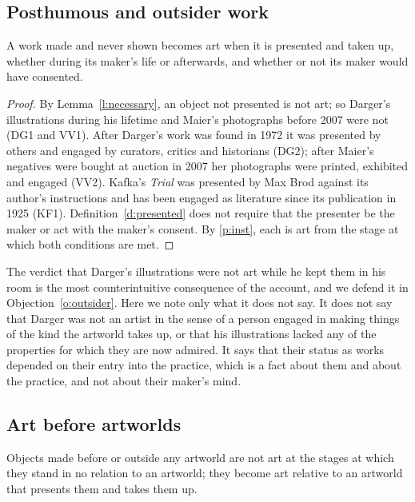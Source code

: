 \documentclass{situationist-preprint}
\begin{document}
\subsection{Posthumous and outsider work}

\begin{proposition}\label{p:posthumous}
A work made and never shown becomes art when it is presented and taken up, whether during its maker's life or afterwards, and whether or not its maker would have consented.
\end{proposition}

\begin{proof}
By Lemma~\ref{l:necessary}, an object not presented is not art; so Darger's illustrations during his lifetime and Maier's photographs before 2007 were not (DG1 and VV1). After Darger's work was found in 1972 it was presented by others and engaged by curators, critics and historians (DG2); after Maier's negatives were bought at auction in 2007 her photographs were printed, exhibited and engaged (VV2). Kafka's \emph{Trial} was presented by Max Brod against its author's instructions and has been engaged as literature since its publication in 1925 (KF1). Definition~\ref{d:presented} does not require that the presenter be the maker or act with the maker's consent. By \ref{p:inst}, each is art from the stage at which both conditions are met.
\end{proof}

The verdict that Darger's illustrations were not art while he kept them in his room is the most counterintuitive consequence of the account, and we defend it in Objection~\ref{o:outsider}. Here we note only what it does not say. It does not say that Darger was not an artist in the sense of a person engaged in making things of the kind the artworld takes up, or that his illustrations lacked any of the properties for which they are now admired. It says that their status as works depended on their entry into the practice, which is a fact about them and about the practice, and not about their maker's mind.

\subsection{Art before artworlds}

\begin{proposition}\label{p:before}
Objects made before or outside any artworld are not art at the stages at which they stand in no relation to an artworld; they become art relative to an artworld that presents them and takes them up.
\end{proposition}
\end{document}
